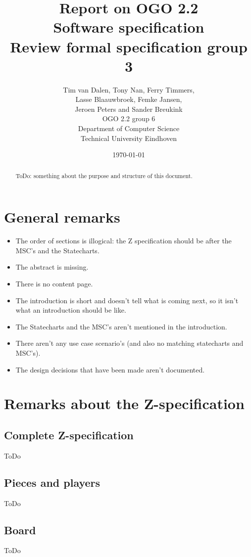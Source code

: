\documentclass[a4paper,11pt]{article}
\title{Report on OGO 2.2 \\ Software specification\\ Review formal specification group 3}
\author{
        Tim van Dalen, Tony Nan, Ferry Timmers, \\ Lasse Blaauwbroek, Femke Jansen, \\Jeroen Peters and Sander Breukink\\ OGO 2.2 group 6 \\
                Department of Computer Science\\
        Technical University Eindhoven\\
}
\date{\today}
\begin{document}
\maketitle

\begin{abstract}
ToDo: something about the purpose and structure of this document.
\end{abstract}

\newpage
	
	\tableofcontents
	\newpage
	
	\section{General remarks}
    \begin{itemize}
        \item The order of sections is illogical: the Z specification should be after the MSC's and the Statecharts.
        \item The abstract is missing.
        \item There is no content page.
        \item The introduction is short and doesn't tell what is coming next, so it isn't what an introduction should be like.
        \item The Statecharts and the MSC's aren't mentioned in the introduction.
        \item There aren't any use case scenario's (and also no matching statecharts and MSC's).
        \item The design decisions that have been made aren't documented.
    \end{itemize}
	
	\section{Remarks about the Z-specification}
    \subsection{Complete Z-specification}
    ToDo
    
    \subsection{Pieces and players}
    ToDo

    \subsection{Board}
    ToDo
\end{document}
